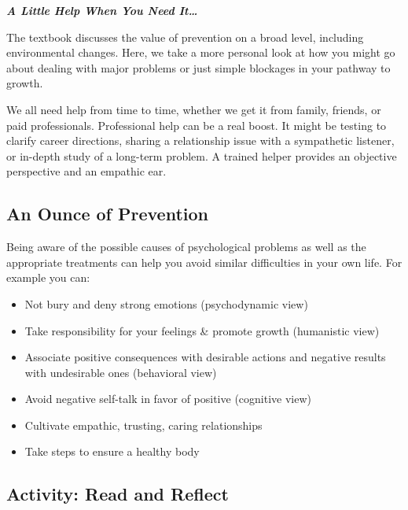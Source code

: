 \documentclass[
]{book}
\providecommand{\tightlist}{%
  \setlength{\itemsep}{0pt}\setlength{\parskip}{0pt}}
\begin{document}
\textbf{\emph{A Little Help When You Need It\ldots{}}}

The textbook discusses the value of prevention on a broad level, including environmental changes. Here, we take a more personal look at how you might go about dealing with major problems or just simple blockages in your pathway to growth.

We all need help from time to time, whether we get it from family, friends, or paid professionals. Professional help can be a real boost. It might be testing to clarify career directions, sharing a relationship issue with a sympathetic listener, or in-depth study of a long-term problem. A trained helper provides an objective perspective and an empathic ear.

\hypertarget{an-ounce-of-prevention}{%
\subsection*{An Ounce of Prevention}\label{an-ounce-of-prevention}}

Being aware of the possible causes of psychological problems as well as the appropriate treatments can help you avoid similar difficulties in your own life. For example you can:

\begin{itemize}
\tightlist
\item
  Not bury and deny strong emotions (psychodynamic view)\\
\item
  Take responsibility for your feelings \& promote growth (humanistic view)\\
\item
  Associate positive consequences with desirable actions and negative results with undesirable ones (behavioral view)\\
\item
  Avoid negative self-talk in favor of positive (cognitive view)\\
\item
  Cultivate empathic, trusting, caring relationships\\
\item
  Take steps to ensure a healthy body
\end{itemize}

\hypertarget{activity-read-and-reflect-24}{%
\subsection*{Activity: Read and Reflect}\label{activity-read-and-reflect-24}}
\end{document}

